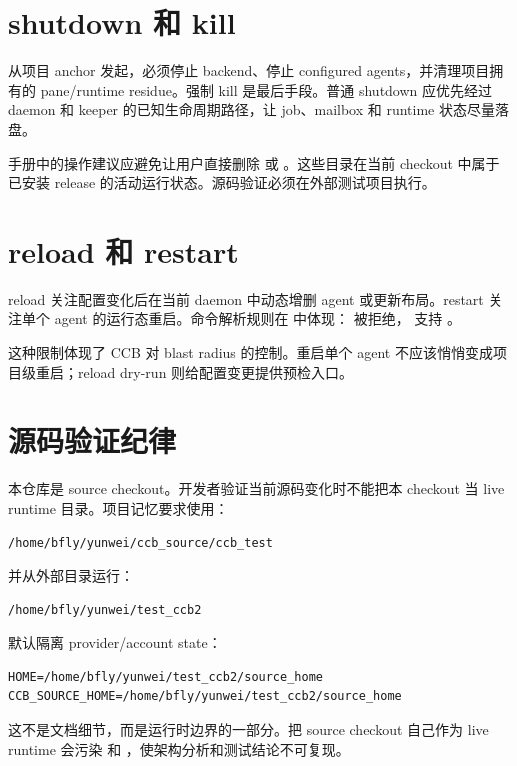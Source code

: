 \section{shutdown 和 kill}

 从项目 anchor 发起，必须停止 backend、停止 configured agents，并清理项目拥有的 pane/runtime residue。强制 kill 是最后手段。普通 shutdown 应优先经过 daemon 和 keeper 的已知生命周期路径，让 job、mailbox 和 runtime 状态尽量落盘。

手册中的操作建议应避免让用户直接删除  或 。这些目录在当前 checkout 中属于已安装 release 的活动运行状态。源码验证必须在外部测试项目执行。

\section{reload 和 restart}

reload 关注配置变化后在当前 daemon 中动态增删 agent 或更新布局。restart 关注单个 agent 的运行态重启。命令解析规则在  中体现： 被拒绝， 支持 。

这种限制体现了 CCB 对 blast radius 的控制。重启单个 agent 不应该悄悄变成项目级重启；reload dry-run 则给配置变更提供预检入口。

\section{源码验证纪律}

本仓库是 source checkout。开发者验证当前源码变化时不能把本 checkout 当 live runtime 目录。项目记忆要求使用：

\begin{lstlisting}
/home/bfly/yunwei/ccb_source/ccb_test
\end{lstlisting}

并从外部目录运行：

\begin{lstlisting}
/home/bfly/yunwei/test_ccb2
\end{lstlisting}

默认隔离 provider/account state：

\begin{lstlisting}
HOME=/home/bfly/yunwei/test_ccb2/source_home
CCB_SOURCE_HOME=/home/bfly/yunwei/test_ccb2/source_home
\end{lstlisting}

这不是文档细节，而是运行时边界的一部分。把 source checkout 自己作为 live runtime 会污染  和 ，使架构分析和测试结论不可复现。
